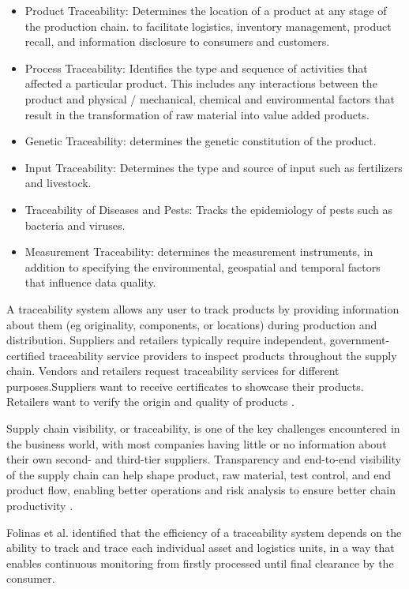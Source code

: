 \begin{itemize}
\item Product Traceability: Determines the location of a product at any stage of the production chain. to facilitate logistics, inventory management, product recall, and information disclosure to consumers and customers.
\item Process Traceability: Identifies the type and sequence of activities that affected a particular product. This includes any interactions between the product and physical / mechanical, chemical and environmental factors that result in the transformation of raw material into value added products.
\item Genetic Traceability: determines the genetic constitution of the product.
\item Input Traceability: Determines the type and source of input such as fertilizers and livestock.
\item Traceability of Diseases and Pests: Tracks the epidemiology of pests such as bacteria and viruses.
\item Measurement Traceability: determines the measurement instruments, in addition to specifying the environmental, geospatial and temporal factors that influence data quality.
\end{itemize}

A traceability system allows any user to track products by providing information about them (eg originality, components, or locations) during production and distribution. Suppliers and retailers typically require independent, government-certified traceability service providers to inspect products throughout the supply chain. Vendors and retailers request traceability services for different purposes.Suppliers want to receive certificates to showcase their products. Retailers want to verify the origin and quality of products \cite{lu2017adaptable}.

Supply chain visibility, or traceability, is one of the key challenges encountered in the business world, with most companies having little or no information about their own second- and third-tier suppliers. Transparency and end-to-end visibility of the supply chain can help shape product, raw material, test control, and end product flow, enabling better operations and risk analysis to ensure better chain productivity \cite{abeyratne2016blockchain}.

Folinas et al. \cite{folinas2006traceability} identified that the efficiency of a traceability system depends on the ability to track and trace each individual asset and logistics units, in a way that enables continuous monitoring from firstly processed until final clearance by the consumer.

